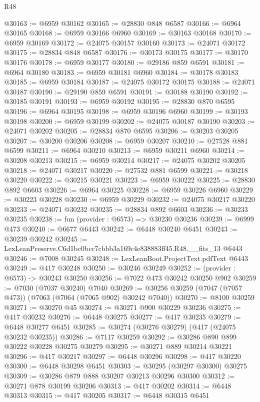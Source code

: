\begin{lexlean}{R48}
\begin{coremodule}
@30163 := @6959 @30162
@30165 := @28830 @848 @6587
@30166 := @6964 @30165
@30168 := @6959 @30166 @6960
@30169 := @30163 @30168
@30170 := @6959 @30169
@30172 := @24075 @30157 @30160
@30173 := @24071 @30172
@30175 := @28834 @848 @6587
@30176 := @30173 @30175
@30177 := @30170 @30176
@30178 := @6959 @30177
@30180 := @29186 @859 @6591
@30181 := @6964 @30180
@30183 := @6959 @30181 @6960
@30184 := @30178 @30183
@30185 := @6959 @30184
@30187 := @24075 @30172 @30175
@30188 := @24071 @30187
@30190 := @29190 @859 @6591
@30191 := @30188 @30190
@30192 := @30185 @30191
@30193 := @6959 @30192
@30195 := @28830 @870 @6595
@30196 := @6964 @30195
@30198 := @6959 @30196 @6960
@30199 := @30193 @30198
@30200 := @6959 @30199
@30202 := @24075 @30187 @30190
@30203 := @24071 @30202
@30205 := @28834 @870 @6595
@30206 := @30203 @30205
@30207 := @30200 @30206
@30208 := @6959 @30207
@30210 := @27528 @881 @6599
@30211 := @6964 @30210
@30213 := @6959 @30211 @6960
@30214 := @30208 @30213
@30215 := @6959 @30214
@30217 := @24075 @30202 @30205
@30218 := @24071 @30217
@30220 := @27532 @881 @6599
@30221 := @30218 @30220
@30222 := @30215 @30221
@30223 := @6959 @30222
@30225 := @28830 @892 @6603
@30226 := @6964 @30225
@30228 := @6959 @30226 @6960
@30229 := @30223 @30228
@30230 := @6959 @30229
@30232 := @24075 @30217 @30220
@30233 := @24071 @30232
@30235 := @28834 @892 @6603
@30236 := @30233 @30235
@30238 := fun (provider : @6573) => @30230 @30236
@30239 := @6999 @473
@30240 := @6677 @6443
@30242 := @6448 @30240 @6451
@30243 := @30239 @30242
@30245 := LexLeanPreserve.C6d1bc0bcc7cbbb3a169c4e838883ff45.R48.__fits_13 @6443
@30246 := @7008 @30245
@30248 := LexLeanBoot.ProjectText.pdfText @6443
@30249 := @417 @30248
@30250 := @30246 @30249
@30252 := (provider : @6573) -> @30243 @30250
@30256 := @7022 @473 @30242 @30250 @902
@30259 := @7030 (@7037 @30240) @7040
@30269 := @30256 @30259 (@7047 (@7057 @473)) (@7063 (@7064 (@7065 @902) @30242 @7040))
@30270 := @8100 @30259
@30271 := @30270 @45
@30274 := @30271 @900 @30229 @30236
@30275 := @417 @30232
@30276 := @6448 @30275
@30277 := @417 @30235
@30279 := @6448 @30277 @6451
@30285 := @30274 (@30276 @30279) (@417 (@24075 @30232 @30235))
@30286 := @7117 @30259
@30292 := @30286 @890 @899 @30222 @30228 @30275 @30279
@30295 := @30271 @889 @30214 @30221
@30296 := @417 @30217
@30297 := @6448 @30296
@30298 := @417 @30220
@30300 := @6448 @30298 @6451
@30303 := @30295 (@30297 @30300) @30275
@30309 := @30286 @879 @888 @30207 @30213 @30296 @30300
@30312 := @30271 @878 @30199 @30206
@30313 := @417 @30202
@30314 := @6448 @30313
@30315 := @417 @30205
@30317 := @6448 @30315 @6451

\end{coremodule}
\end{lexlean}

